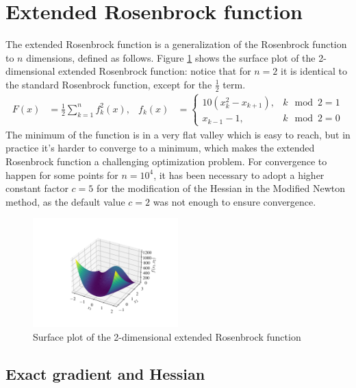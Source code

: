 \section{Extended Rosenbrock function}
\label{sec:extended_rosenbrock_results}

The extended Rosenbrock function is a generalization of the Rosenbrock function to $n$ dimensions, defined as follows.
Figure \ref{fig:extended_rosenbrock_surf} shows the surface plot of the 2-dimensional extended Rosenbrock function: notice that for $n=2$ it is identical to the standard Rosenbrock function, except for the $\frac12$ term.
\begin{align}
\label{eq:extended_rosenbrock}
F(x) &= \frac12 \sum_{k=1}^n f_k^2(x), &
f_k(x) &= \left \{ \begin{array}{ll}
10(x_k^2 - x_{k+1}), & k\mod 2 = 1\\
x_{k-1} -1, & k\mod 2 = 0
\end{array} \right .
\end{align}
The minimum of the function is in a very flat valley which is easy to reach, but in practice it's harder to converge to a minimum, which makes the extended Rosenbrock function a challenging optimization problem.
For convergence to happen for some points for $n=10^4$, it has been necessary to adopt a higher constant factor $c=5$ for the modification of the Hessian in the Modified Newton method, as the default value $c=2$ was not enough to ensure convergence.

\begin{figure}
    \centering
    \includegraphics[width=0.5\textwidth]{figures/extended_rosenbrock_surf.pdf}
    \caption{Surface plot of the 2-dimensional extended Rosenbrock function}
    \label{fig:extended_rosenbrock_surf}
\end{figure}

\subsection{Exact gradient and Hessian}
\label{subsec:extended_rosenbrock_exact}

